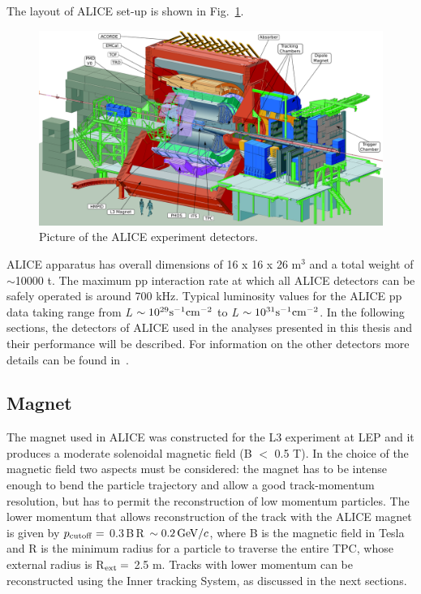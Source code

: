The layout of ALICE set-up is shown in Fig.~\ref{fig:imageALICE}. 
\begin{figure}[!t]
\centering
\includegraphics[width=12cm]{FigCap3/alice.png}
\caption{Picture of the ALICE experiment detectors.}
\label{fig:imageALICE}
\end{figure}
ALICE apparatus has overall dimensions of 16 x 16 x 26 m$^3$ and a total 
weight of $\sim$10000 t. The maximum pp interaction rate at which all ALICE 
detectors can be safely operated is around 700 kHz. Typical luminosity values 
for the ALICE pp data taking range from \textit{L} $\sim 10^{29}{\rm s}^{-1}{\rm cm}^{-2}$ 
to \textit{L} $\sim 10^{31}{\rm s}^{-1}{\rm cm}^{-2}$.
In the following sections, the detectors of ALICE used in the analyses presented in this thesis and their 
performance will be described. For information on the other detectors more details can be found in~\cite{Aamodt:2008zz}.

\subsection{Magnet}
\label{sec:Magnet}
The magnet used in ALICE was constructed for the L3 experiment at LEP and 
it produces a moderate solenoidal magnetic field (B $<$ 0.5 T). In the choice 
of the magnetic field two aspects must be considered: the magnet has to be intense 
enough to bend the particle trajectory and allow a good track-momentum resolution, 
but has to permit the reconstruction of low 
momentum particles. The lower momentum that allows reconstruction of the track 
with the ALICE magnet is given by $p_{\rm cutoff}=$ 0.3$\,$B$\,$R $\sim 0.2\,\mathrm{GeV}/c$, 
where B is the magnetic field in Tesla and R is the minimum radius for a particle to 
traverse the entire TPC, whose external radius is R$_{\rm ext}=$ 2.5 m.
Tracks with lower momentum can be reconstructed using the Inner tracking System, as discussed
in the next sections.

